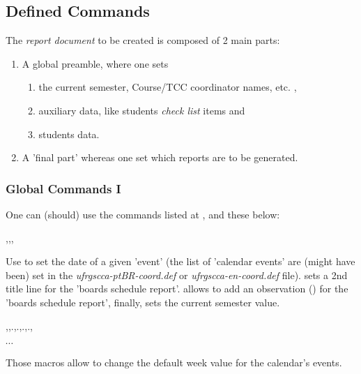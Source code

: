 \documentclass[dctools,english]{ufrgscca} %
\begin{document}
\subsection{Defined Commands}
The \emph{report document} to be created is composed of 2 main parts:
\begin{enumerate}
	\item A global preamble, where one sets
	\begin{enumerate}
		\item the current semester, Course/TCC coordinator names, etc. ,
		\item auxiliary data, like students \emph{check list} items and
		\item students data.
	\end{enumerate}
    \item A 'final part' whereas one set which reports are to be generated.
\end{enumerate}

\subsubsection{Global Commands I}
One can (should) use the commands listed at , and these below:

\begin{Macros}{\tcccalendareventdate,\boardstitleB,\boardsOBS,\TCCperiod}
	\begin{Syntax}%
	\end{Syntax}
Use \Macro{\tcccalendareventdate}{} to set the date of a given 'event' (the list of 'calendar events' are (might have been) set in the \emph{ufrgscca-ptBR-coord.def} or \emph{ufrgscca-en-coord.def} file).  sets a 2nd title line for the 'boards schedule report'. \Macro{\boardsOBS}{} allows to add an observation () for the 'boards schedule report', finally, \Macro{\TCCperiod} sets the current semester value.
\end{Macros}

\begin{Macros}{\tcceventAweek,\tcceventBweek,.,.,.,.,\tcceventJweek}
    \begin{Syntax}%
        \ensuremath{\cdots}
    \end{Syntax}
    Those macros allow to change the default week value for the calendar's events.
\end{Macros}
\end{document}
